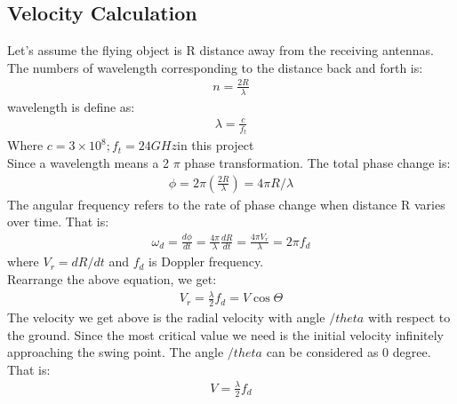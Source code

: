 \subsection{Velocity Calculation}
Let’s assume the flying object is R distance away from the receiving antennas. The numbers of wavelength corresponding to the distance back and forth is:
\begin{align}
n=\frac{2 R}{\lambda}    
\end{align}
wavelength is define as:
\begin{align}
\lambda=\frac{c}{f_{t}}
\end{align}
Where $c=3 \times 10^{8} ; f_{t}=24 G H z$in this project\\
Since a wavelength means a 2 $\pi$ phase transformation. The total phase change is:
\begin{align}
\phi=2 \pi\left(\frac{2 R}{\lambda}\right)=4 \pi R / \lambda
\end{align}
The angular frequency refers to the rate of phase change when distance R varies over time. That is:
\begin{align}
\omega_{d}=\frac{d \phi}{d t}=\frac{4 \pi}{\lambda} \frac{d R}{d t}=\frac{4 \pi V_{r}}{\lambda}=2 \pi f_{d}
\end{align}
where $V_{r}=d R / d t$ and $f_{d}$ is Doppler frequency.\\
Rearrange the above equation, we get:
\begin{align}
V_{r}=\frac{\lambda}{2} f_{d}=V \cos \Theta
\end{align}
The velocity we get above is the radial velocity with angle $/theta$ with respect to the ground. Since the most critical value we need is the initial velocity infinitely approaching the swing point. The angle $/theta$ can be considered as 0 degree. That is:
\begin{align}
V=\frac{\lambda}{2} f_{d}
\end{align}


